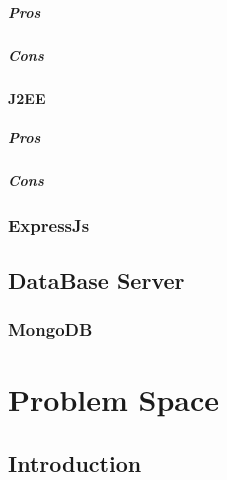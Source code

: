 \documentclass[11pt, openany]{report}
\begin{document}
        \paragraph{Pros}
        \paragraph{Cons}

      \subsubsection{J2EE}

        \paragraph{Pros}
        \paragraph{Cons}

    \subsection{ ExpressJs }
  \section{ DataBase Server }
    \subsection{MongoDB}
\chapter{Problem Space}
  \section*{Introduction}

\clearpage
\end{document}
